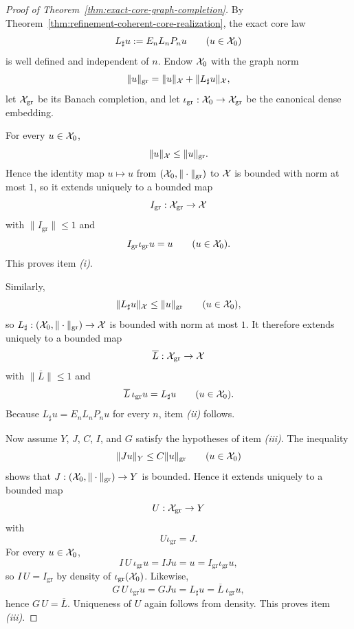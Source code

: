 \begin{proof}[Proof of Theorem~\ref{thm:exact-core-graph-completion}]
\label{proof:thm:exact-core-graph-completion}
By Theorem~\ref{thm:refinement-coherent-core-realization}, the exact core law
\[
L_\sharp u:=E_nL_nP_nu
\qquad (u\in\mathcal{X}_0)
\]
is well defined and independent of \(n\). Endow \(\mathcal{X}_0\) with the graph norm
\[
\|u\|_{\mathrm{gr}}=\|u\|_{\mathcal{X}}+\|L_\sharp u\|_{\mathcal{X}},
\]
let \(\mathcal{X}_{\mathrm{gr}}\) be its Banach completion, and let
\(\iota_{\mathrm{gr}}:\mathcal{X}_0\to\mathcal{X}_{\mathrm{gr}}\) be the canonical dense
embedding.

For every \(u\in\mathcal{X}_0\),
\[
\|u\|_{\mathcal{X}}\le \|u\|_{\mathrm{gr}}.
\]
Hence the identity map \(u\mapsto u\) from \((\mathcal{X}_0,\|\cdot\|_{\mathrm{gr}})\)
to \(\mathcal{X}\) is bounded with norm at most \(1\), so it extends uniquely to a
bounded map
\[
I_{\mathrm{gr}}:\mathcal{X}_{\mathrm{gr}}\to\mathcal{X}
\]
with \(\|I_{\mathrm{gr}}\|\le 1\) and
\[
I_{\mathrm{gr}}\iota_{\mathrm{gr}}u=u
\qquad (u\in\mathcal{X}_0).
\]
This proves item \emph{(i)}.

Similarly,
\[
\|L_\sharp u\|_{\mathcal{X}}\le \|u\|_{\mathrm{gr}}
\qquad (u\in\mathcal{X}_0),
\]
so \(L_\sharp:(\mathcal{X}_0,\|\cdot\|_{\mathrm{gr}})\to\mathcal{X}\) is bounded with norm at
most \(1\). It therefore extends uniquely to a bounded map
\[
\overline L:\mathcal{X}_{\mathrm{gr}}\to\mathcal{X}
\]
with \(\|\overline L\|\le 1\) and
\[
\overline L\,\iota_{\mathrm{gr}}u=L_\sharp u
\qquad (u\in\mathcal{X}_0).
\]
Because \(L_\sharp u=E_nL_nP_nu\) for every \(n\), item \emph{(ii)} follows.

Now assume \(Y\), \(J\), \(C\), \(I\), and \(G\) satisfy the hypotheses of
item \emph{(iii)}. The inequality
\[
\|Ju\|_Y\le C\|u\|_{\mathrm{gr}}
\qquad (u\in\mathcal{X}_0)
\]
shows that \(J:(\mathcal{X}_0,\|\cdot\|_{\mathrm{gr}})\to Y\) is bounded. Hence it
extends uniquely to a bounded map
\[
U:\mathcal{X}_{\mathrm{gr}}\to Y
\]
with
\[
U\iota_{\mathrm{gr}}=J.
\]
For every \(u\in\mathcal{X}_0\),
\[
I\,U\,\iota_{\mathrm{gr}}u=IJu=u=I_{\mathrm{gr}}\iota_{\mathrm{gr}}u,
\]
so \(I\,U=I_{\mathrm{gr}}\) by density of \(\iota_{\mathrm{gr}}(\mathcal{X}_0)\).
Likewise,
\[
G\,U\,\iota_{\mathrm{gr}}u=GJu=L_\sharp u
=\overline L\,\iota_{\mathrm{gr}}u,
\]
hence \(G\,U=\overline L\). Uniqueness of \(U\) again follows from density.
This proves item \emph{(iii)}.
\end{proof}

